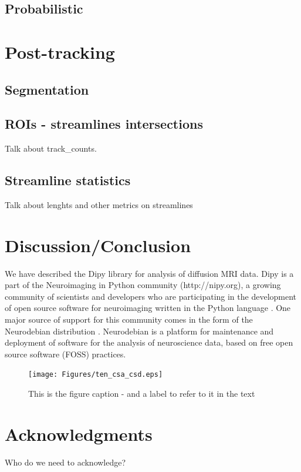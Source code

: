 \documentclass{bioinfo}
\begin{document}
\subsection{Probabilistic}

\section{Post-tracking}

\subsection{Segmentation}

\subsection{ROIs - streamlines intersections}

Talk about track\_counts.

\subsection{Streamline statistics}

Talk about lenghts and other metrics on streamlines

\section{Discussion/Conclusion}

We have described the Dipy library for analysis of diffusion MRI data. Dipy is a part of the Neuroimaging in Python community (http://nipy.org), a growing community of scientists and developers who are participating in the development of open source software for neuroimaging written in the Python language  . One major source of support for this community comes in the form of the Neurodebian distribution \citep{Halchenko2012}. Neurodebian is a platform for maintenance and deployment of software for the analysis of neuroscience data, based on free open source software (FOSS) practices.

\begin{figure}
\centerline{\texttt{[image: Figures/ten\_csa\_csd.eps]}}
\caption{This is the figure caption - and a label to refer to it in the text \label{Fig:ten_csa_csd}}
\end{figure}

\section*{Acknowledgments}
Who do we need to acknowledge?
\end{document}
